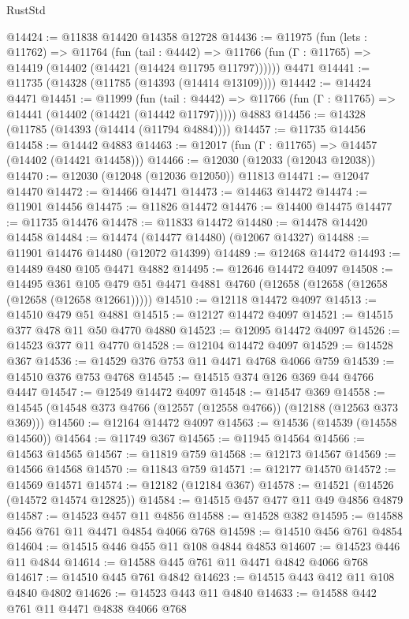 \begin{lexlean}{RustStd}
\begin{coremodule}
{\begin{coremodule}
{{{{{{{{{{{{{{{{{{{{{{{{{{{{{{{{{{{{{{{{{{{{{{{{{{{{{{{{{{{{{{{{{{{{@14424 := @11838 @14420 @14358 @12728
@14436 := @11975
    (fun (lets : @11762) =>
    @11764
      (fun (tail : @4442) =>
      @11766 (fun (Γ : @11765) => @14419 (@14402 (@14421 (@14424 @11795 @11797))))))
    @4471
@14441 := @11735 (@14328 (@11785 (@14393 (@14414 @13109))))
@14442 := @14424 @4471
@14451 := @11999
    (fun (tail : @4442) => @11766 (fun (Γ : @11765) => @14441 (@14402 (@14421 (@14442 @11797)))))
    @4883
@14456 := @14328 (@11785 (@14393 (@14414 (@11794 @4884))))
@14457 := @11735 @14456
@14458 := @14442 @4883
@14463 := @12017 (fun (Γ : @11765) => @14457 (@14402 (@14421 @14458)))
@14466 := @12030 (@12033 (@12043 @12038))
@14470 := @12030 (@12048 (@12036 @12050)) @11813
@14471 := @12047 @14470
@14472 := @14466 @14471
@14473 := @14463 @14472
@14474 := @11901 @14456
@14475 := @11826 @14472
@14476 := @14400 @14475
@14477 := @11735 @14476
@14478 := @11833 @14472
@14480 := @14478 @14420 @14458
@14484 := @14474 (@14477 @14480) (@12067 @14327)
@14488 := @11901 @14476 @14480 (@12072 @14399)
@14489 := @12468 @14472
@14493 := @14489 @480 @105 @4471 @4882
@14495 := @12646 @14472 @4097
@14508 := @14495
    @361
    @105
    @479
    @51
    @4471
    @4881
    @4760
    (@12658 (@12658 (@12658 (@12658 (@12658 @12661)))))
@14510 := @12118 @14472 @4097
@14513 := @14510 @479 @51 @4881
@14515 := @12127 @14472 @4097
@14521 := @14515 @377 @478 @11 @50 @4770 @4880
@14523 := @12095 @14472 @4097
@14526 := @14523 @377 @11 @4770
@14528 := @12104 @14472 @4097
@14529 := @14528 @367
@14536 := @14529 @376 @753 @11 @4471 @4768 @4066 @759
@14539 := @14510 @376 @753 @4768
@14545 := @14515 @374 @126 @369 @44 @4766 @4447
@14547 := @12549 @14472 @4097
@14548 := @14547 @369
@14558 := @14545 (@14548 @373 @4766 (@12557 (@12558 @4766)) (@12188 (@12563 @373 @369)))
@14560 := @12164 @14472 @4097
@14563 := @14536 (@14539 (@14558 @14560))
@14564 := @11749 @367
@14565 := @11945 @14564
@14566 := @14563 @14565
@14567 := @11819 @759
@14568 := @12173 @14567
@14569 := @14566 @14568
@14570 := @11843 @759
@14571 := @12177 @14570
@14572 := @14569 @14571
@14574 := @12182 (@12184 @367)
@14578 := @14521 (@14526 (@14572 @14574 @12825))
@14584 := @14515 @457 @477 @11 @49 @4856 @4879
@14587 := @14523 @457 @11 @4856
@14588 := @14528 @382
@14595 := @14588 @456 @761 @11 @4471 @4854 @4066 @768
@14598 := @14510 @456 @761 @4854
@14604 := @14515 @446 @455 @11 @108 @4844 @4853
@14607 := @14523 @446 @11 @4844
@14614 := @14588 @445 @761 @11 @4471 @4842 @4066 @768
@14617 := @14510 @445 @761 @4842
@14623 := @14515 @443 @412 @11 @108 @4840 @4802
@14626 := @14523 @443 @11 @4840
@14633 := @14588 @442 @761 @11 @4471 @4838 @4066 @768
}}}}}}}}}}}}}}}}}}}}}}}}}}}}}}}}}}}}}}}}}}}}}}}}}}}}}}}}}}}}}}}}}}}}
\end{coremodule}}
\end{coremodule}
\end{lexlean}
